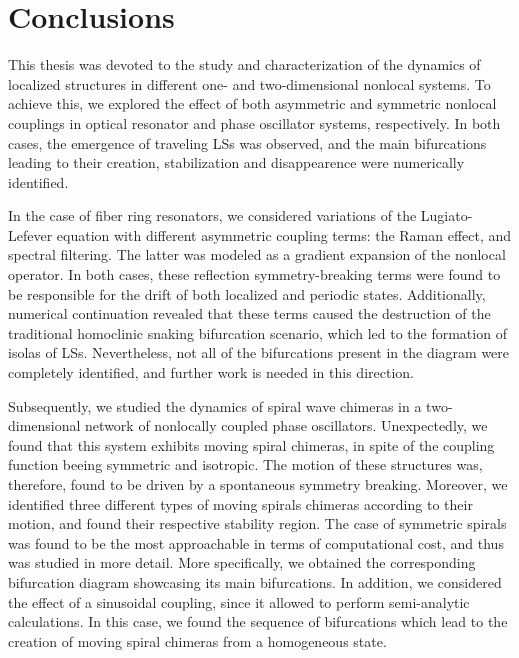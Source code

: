 \chapter{Conclusions}
\label{ch:conclu}

This thesis was devoted to the study and characterization of the dynamics
of localized structures in different one- and two-dimensional nonlocal systems.
To achieve this, we explored the effect of both asymmetric and symmetric nonlocal
couplings in optical resonator and phase oscillator systems, respectively. In 
both cases, the emergence of traveling LSs was observed, and the main bifurcations
leading to their creation, stabilization and disappearence were numerically identified.

In the case of fiber ring resonators, we considered variations of the 
Lugiato-Lefever equation with different asymmetric coupling terms:
the Raman effect, and spectral filtering. The latter was modeled
as a gradient expansion of the nonlocal operator. In both cases, these
reflection symmetry-breaking terms were found to be responsible
for the drift of both localized and periodic states. Additionally,
numerical continuation revealed that these terms caused 
the destruction of the traditional homoclinic snaking 
bifurcation scenario, which led to the formation of isolas of LSs.
Nevertheless, not all of the bifurcations present in the diagram were completely
identified, and further work is needed in this direction.

Subsequently, we studied the dynamics of spiral wave chimeras in a
two-dimensional network of nonlocally coupled phase oscillators. 
Unexpectedly, we found that this system exhibits moving spiral chimeras,
in spite of the coupling function beeing symmetric and isotropic. 
The motion of these structures was, therefore, found to be driven by a spontaneous
symmetry breaking. Moreover, we identified three different types of moving
spirals chimeras according to their motion, and found their respective
stability region. The case of symmetric spirals was found to be the most
approachable in terms of computational cost, and thus was studied in more detail.
More specifically, we obtained the corresponding bifurcation diagram showcasing
its main bifurcations. In addition, we considered the effect of a sinusoidal coupling,
since it allowed to perform semi-analytic calculations. In this case, we found
the sequence of bifurcations which lead to the creation of moving spiral chimeras
from a homogeneous state.



